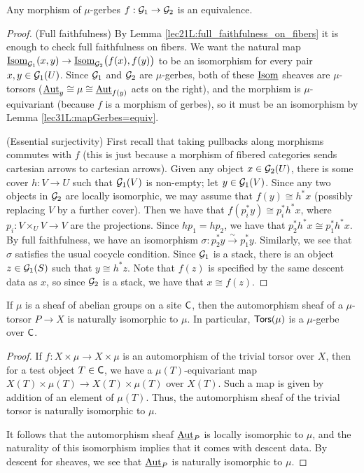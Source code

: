 \begin{lemma}\label{lec31L:mapGerbes=equiv}
  Any morphism of $\mu$-gerbes $f:\mathcal{G}_1\to \mathcal{G}_2$ is an equivalence.
\end{lemma}
\begin{proof}
 (Full faithfulness) By Lemma \ref{lec21L:full_faithfulness_on_fibers} it is enough to check full faithfulness on fibers. We want the natural map $\operatorname{\underline{Isom}}_{\mathcal{G}_1}(x,y)\to \operatorname{\underline{Isom}}_{\mathcal{G}_2}\bigl(f(x),f(y)\bigr)$ to be an isomorphism for every pair $x,y\in\mathcal{G}_1(U)$. Since $\mathcal{G}_1$ and $\mathcal{G}_2$ are $\mu$-gerbes, both of these $\operatorname{\underline{Isom}}$ sheaves are $\mu$-torsors ($\operatorname{\underline{Aut}}_y\cong \mu\cong \operatorname{\underline{Aut}}_{f(y)}$ acts on the right), and the morphism is $\mu$-equivariant (because $f$ is a morphism of gerbes), so it must be an isomorphism by Lemma \ref{lec31L:mapGerbes=equiv}.

 (Essential surjectivity) First recall that taking pullbacks along morphisms commutes with $f$ (this is just because a morphism of fibered categories sends cartesian arrows to cartesian arrows). Given any object $x\in \mathcal{G}_2(U)$, there is some cover $h:V\to U$ such that $\mathcal{G}_1(V)$ is non-empty; let $y\in \mathcal{G}_1(V)$. Since any two objects in $\mathcal{G}_2$ are locally isomorphic, we may assume that $f(y)\cong h^*x$ (possibly replacing $V$ by a further cover). Then we have that $f(p_i^*y)\cong p_i^*h^*x$, where $p_i:V\times_U V\to V$ are the projections. Since $hp_1=hp_2$, we have that $p_2^*h^*x\cong p_1^*h^*x$. By full faithfulness, we have an isomorphism $\sigma:p_2^*y\xrightarrow\sim p_1^*y$. Similarly, we see that $\sigma$ satisfies the usual cocycle condition. Since $\mathcal{G}_1$ is a stack, there is an object $z\in \mathcal{G}_1(S)$ such that $y\cong h^*z$. Note that $f(z)$ is specified by the same descent data as $x$, so since $\mathcal{G}_2$ is a stack, we have that $x\cong f(z)$.
\end{proof}
\begin{lemma}
 If $\mu$ is a sheaf of abelian groups on a site $\text{\sf C}$, then the automorphism sheaf of a $\mu$-torsor $P\to X$ is naturally isomorphic to $\mu$. In particular, $\text{\sf Tors}(\mu)$ is a $\mu$-gerbe over $\text{\sf C}$.
\end{lemma}
\begin{proof}
 If $f:X\times \mu\to X\times \mu$ is an automorphism of the trivial torsor over $X$, then for a test object $T\in \text{\sf C}$, we have a $\mu(T)$-equivariant map $X(T)\times \mu(T)\to X(T)\times \mu(T)$ over $X(T)$. Such a map is given by addition of an element of $\mu(T)$. Thus, the automorphism sheaf of the trivial torsor is naturally isomorphic to $\mu$.

 It follows that the automorphism sheaf $\operatorname{\underline{Aut}}_P$ is locally isomorphic to $\mu$, and the naturality of this isomorphism implies that it comes with descent data. By descent for sheaves, we see that $\operatorname{\underline{Aut}}_P$ is naturally isomorphic to $\mu$.
\end{proof}
